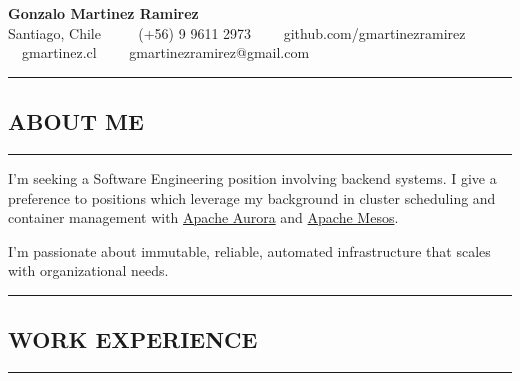 \documentclass[10pt,letterpaper]{article}
\newcommand{\titlePersonalInfo}[6]{
  \begin{center}{\huge \textbf{#1}}
  \\  #2 \ \ \textbullet
    \ \ #3\ \ \textbullet
    \ \ #4\ \ \textbullet
    \ \ #5\ \ \textbullet
    \ \ #6    
  \end{center}
}
\newcommand{\sectionTitle}[1]{
  \hrule
  \vspace{-1.0em} 
  \subsection*{\uppercase{\textbf{#1}}}
  \vspace{-0.3em}
    \hrule
    \vspace{0.5em}  
}
\begin{document}
    
  \titlePersonalInfo{Gonzalo Martinez Ramirez}{Santiago, Chile}{(+56) 9 9611 2973}{github.com/gmartinezramirez}{gmartinez.cl}{gmartinezramirez@gmail.com}
  
  
  \sectionTitle{About me}
  
  \noindent I'm seeking a Software Engineering position involving backend systems.
  I give a preference to positions which leverage my background in cluster
  scheduling and container management with \href{aurora.apache.org}{Apache Aurora}
  and \href{mesos.apache.org}{Apache Mesos}.
  
  \noindent I'm passionate about immutable, reliable, automated infrastructure
  that scales with organizational needs.
  \\
  
  
  \sectionTitle{Work Experience}
  
\end{document}
